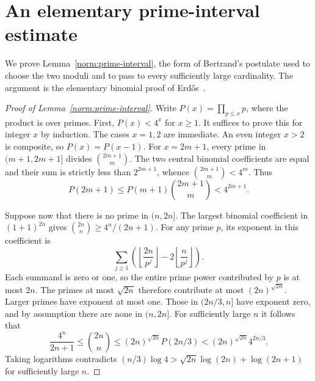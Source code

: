 \section{An elementary prime-interval estimate}
\label{app:prime-interval}

We prove Lemma~\ref{norm:prime-interval}, the form of Bertrand's postulate
used to choose the two moduli and to pass to every sufficiently large
cardinality. The argument is the elementary binomial proof of
Erd\H{o}s~\cite{Erdos1932}.

\begin{proof}[Proof of Lemma~\ref{norm:prime-interval}]
Write $P(x)=\prod_{p\le x}p$, where the product is over primes.
First, $P(x)<4^x$ for $x\ge1$.  It suffices to prove this for integer
$x$ by induction.  The cases $x=1,2$ are immediate.  An even integer
$x>2$ is composite, so $P(x)=P(x-1)$.  For $x=2m+1$, every prime in
$(m+1,2m+1]$ divides $\binom{2m+1}{m}$.  The two central binomial
coefficients are equal and their sum is strictly less than
$2^{2m+1}$, whence $\binom{2m+1}{m}<4^m$.  Thus
\[
 P(2m+1)\le P(m+1)\binom{2m+1}{m}<4^{2m+1}.
\]

Suppose now that there is no prime in $(n,2n]$.  The largest binomial
coefficient in $(1+1)^{2n}$ gives
$\binom{2n}{n}\ge4^n/(2n+1)$.
For any prime $p$, its exponent in this coefficient is
\[
 \sum_{j\ge1}\left(\left\lfloor\frac{2n}{p^j}\right\rfloor
              -2\left\lfloor\frac{n}{p^j}\right\rfloor\right).
\]
Each summand is zero or one, so the entire prime power contributed
by $p$ is at most $2n$.  The primes at most $\sqrt{2n}$ therefore
contribute at most $(2n)^{\sqrt{2n}}$.  Larger primes have exponent
at most one.  Those in $(2n/3,n]$ have exponent zero, and by assumption
there are none in $(n,2n]$.  For sufficiently large $n$ it follows that
\[
 \frac{4^n}{2n+1}\le\binom{2n}{n}
 \le(2n)^{\sqrt{2n}}P(2n/3)
 <(2n)^{\sqrt{2n}}4^{2n/3}.
\]
Taking logarithms contradicts
$(n/3)\log4>\sqrt{2n}\log(2n)+\log(2n+1)$ for sufficiently large $n$.
\end{proof}
